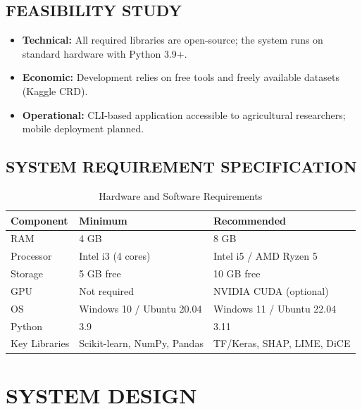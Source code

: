\documentclass[12pt,a4paper,oneside]{report}
\begin{document}
\section{FEASIBILITY STUDY}

\begin{itemize}[leftmargin=*, label=$\bullet$]
  \item \textbf{Technical:} All required libraries are open-source; the system runs on standard hardware with Python 3.9+.
  \item \textbf{Economic:} Development relies on free tools and freely available datasets (Kaggle CRD).
  \item \textbf{Operational:} CLI-based application accessible to agricultural researchers; mobile deployment planned.
\end{itemize}

\section{SYSTEM REQUIREMENT SPECIFICATION}

\begin{table}[H]
\centering
\caption{Hardware and Software Requirements}
\label{tab:reqs}
\renewcommand{\arraystretch}{1.3}
\begin{tabular}{p{3.5cm} p{5cm} p{4cm}}
\toprule
\textbf{Component} & \textbf{Minimum} & \textbf{Recommended} \\
\midrule
RAM & 4 GB & 8 GB \\
Processor & Intel i3 (4 cores) & Intel i5 / AMD Ryzen 5 \\
Storage & 5 GB free & 10 GB free \\
GPU & Not required & NVIDIA CUDA (optional) \\
OS & Windows 10 / Ubuntu 20.04 & Windows 11 / Ubuntu 22.04 \\
Python & 3.9 & 3.11 \\
Key Libraries & Scikit-learn, NumPy, Pandas & TF/Keras, SHAP, LIME, DiCE \\
\bottomrule
\end{tabular}
\end{table}

\chapter{SYSTEM DESIGN}
\end{document}
